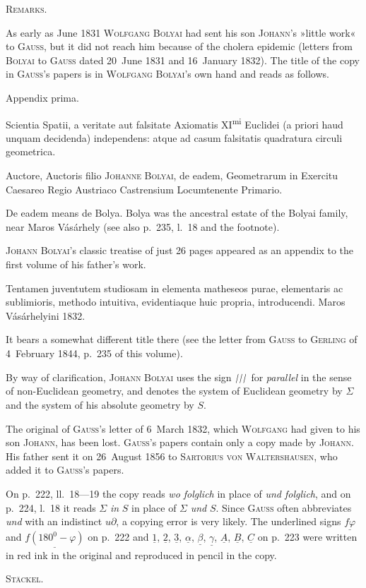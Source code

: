 %
\begin{center}\textsc{Remarks.}\end{center}
\begingroup\small
As early as June 1831 \textsc{Wolfgang Bolyai} had sent his son \textsc{Johann}'s »little work« to \textsc{Gauss}, but it did not reach him because of the cholera epidemic (letters from \textsc{Bolyai} to \textsc{Gauss} dated 20~June 1831 and 16~January 1832). The title of the copy in \textsc{Gauss}'s papers is in \textsc{Wolfgang Bolyai}'s own hand and reads as follows.
\begin{center}Appendix prima.\end{center}
\noindent Scientia Spatii, a veritate aut falsitate Axiomatis XI\textsuperscript{mi} Euclidei (a priori haud unquam decidenda) independens: atque ad casum falsitatis quadratura circuli geometrica.

Auctore, Auctoris filio \textsc{Johanne Bolyai}, de eadem, Geometrarum in Exercitu Caesareo Regio Austriaco Castrensium Locumtenente Primario.

De eadem means de Bolya. Bolya was the ancestral estate of the Bolyai family, near Maros Vásárhely (see also p.~235, l.~18 and the footnote).

\textsc{Johann Bolyai}'s classic treatise of just 26 pages appeared as an appendix to the first volume of his father's work.

Tentamen juventutem studiosam in elementa matheseos purae, elementaris ac sublimioris, methodo intuitiva, evidentiaque huic propria, introducendi. Maros Vásárhelyini 1832.

\noindent It bears a somewhat different title there (see the letter from \textsc{Gauss} to \textsc{Gerling} of 4~February 1844, p.~235 of this volume).

By way of clarification, \textsc{Johann Bolyai} uses the sign $\TripleParallel$ for \emph{parallel} in the sense of non-Euclidean geometry, and denotes the system of Euclidean geometry by $\Sigma$ and the system of his absolute geometry by $S$.

The original of \textsc{Gauss}'s letter of 6~March 1832, which \textsc{Wolfgang} had given to his son \textsc{Johann}, has been lost. \textsc{Gauss}'s papers contain only a copy made by \textsc{Johann}. His father sent it on 26~August 1856 to \textsc{Sartorius von Waltershausen}, who added it to \textsc{Gauss}'s papers.

On p.~222, ll.~18—19 the copy reads \emph{wo folglich} in place of \emph{und folglich}, and on p.~224, l.~18 it reads $\Sigma$ \emph{in} $S$ in place of $\Sigma$ \emph{und} $S$. Since \textsc{Gauss} often abbreviates \emph{und} with an indistinct $u\partial$, a copying error is very likely. The underlined signs $\underline{f\varphi}$ and $\underline{f(180^{0}-\varphi)}$ on p.~222 and $\underline{1}$, $\underline{2}$, $\underline{3}$, $\underline{\alpha}$, $\underline{\beta}$, $\underline{\gamma}$, $\underline{A}$, $\underline{B}$, $\underline{C}$ on p.~223 were written in red ink in the original and reproduced in pencil in the copy.
\begin{flushright}\textsc{Stäckel.}\end{flushright}
\par\endgroup
